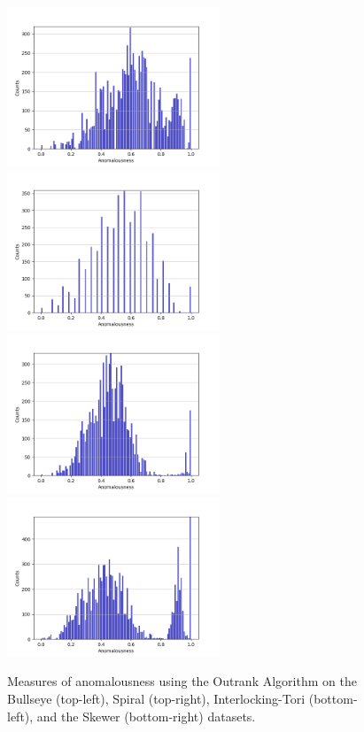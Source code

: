 \begin{figure}[!t]
\centering
\includegraphics[width=2.5in]{static/bullseye_outrank.png}
\includegraphics[width=2.5in]{static/spiral_outrank.png}
\includegraphics[width=2.5in]{static/interlocking_tori_outrank.png}
\includegraphics[width=2.5in]{static/skewer_outrank.png}

\caption{
Measures of anomalousness using the Outrank Algorithm on the Bullseye (top-left), Spiral (top-right), Interlocking-Tori (bottom-left), and the Skewer (bottom-right) datasets.
}

\label{results:histograms:outrank}
\end{figure}


